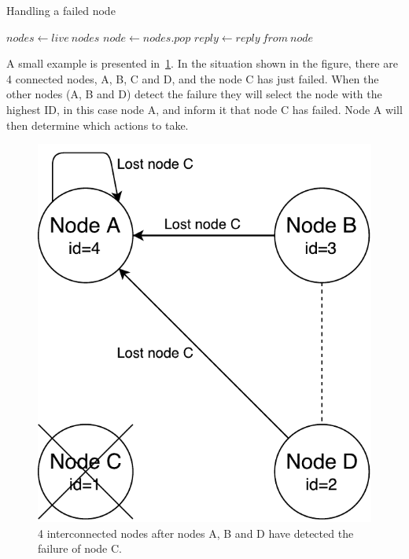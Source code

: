 \documentclass{cslthse-msc}
\begin{document}
\begin{algorithm}\label{alg:node_failure}
	\caption{Handling a failed node}
	\begin{algorithmic}[1]
	\State $nodes\gets live\ nodes$
	\Do
		\State $node\gets nodes.pop$
		\State
		\State $reply\gets reply\ from\ node$
	\end{algorithmic}
\end{algorithm}

A small example is presented in~\cref{fig:handling_node_failure}. In the situation shown in the figure, there are 4 connected nodes, A, B, C and D, and the node C has just failed. When the other nodes (A, B and D) detect the failure they will select the node with the highest ID, in this case node A, and inform it that node C has failed. Node A will then determine which actions to take.

\begin{figure}[!hbt]
\centering
\includegraphics[scale=0.5]{images/handling_node_failure.pdf}
\caption{4 interconnected nodes after nodes A, B and D have detected the failure of node C.}\label{fig:handling_node_failure}
\end{figure}
\end{document}
